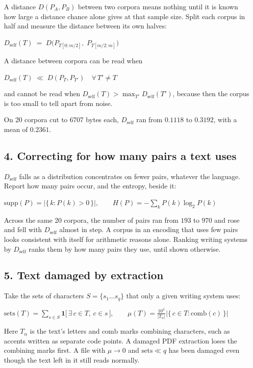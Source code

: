 A distance \(D(P_A,P_B)\) between two corpora means nothing until it is known how large a distance chance alone gives at that sample size. Split each corpus in half and measure the distance between its own halves:

\(D_{\text{self}}(T) \;=\; D\bigl(P_{T[0:m/2]},\; P_{T[m/2:m]}\bigr)\)

A distance between corpora can be read when

\(D_{\text{self}}(T) \;\ll\; D(P_T, P_{T'}) \quad \forall\, T' \neq T\)

and cannot be read when \(D_{\text{self}}(T) > \max_{T'} D_{\text{self}}(T')\), because then the corpus is too small to tell apart from noise.

On 20 corpora cut to 6707 bytes each, \(D_{\text{self}}\) ran from \(0.1118\) to \(0.3192\), with a mean of \(0.2361\).

\subsection{4. Correcting for how many pairs a text uses}

\(D_{\text{self}}\) falls as a distribution concentrates on fewer pairs, whatever the language. Report how many pairs occur, and the entropy, beside it:

\(\mathrm{supp}(P) = \bigl|\{\,k : P(k) > 0\,\}\bigr|, \qquad H(P) = -\sum_{k} P(k)\log_2 P(k)\)

Across the same 20 corpora, the number of pairs ran from \(193\) to \(970\) and rose and fell with \(D_{\text{self}}\) almost in step. A corpus in an encoding that uses few pairs looks consistent with itself for arithmetic reasons alone. Ranking writing systems by \(D_{\text{self}}\) ranks them by how many pairs they use, until shown otherwise.

\subsection{5. Text damaged by extraction}

Take the sets of characters \(S = \{s_1 \dots s_q\}\) that only a given writing system uses:

\(\mathrm{sets}(T) = \sum_{s \in S} \mathbf{1}\bigl[\,\exists\, c \in T,\ c \in s\,\bigr], \qquad \mu(T) = \frac{10^3}{|T_\alpha|}\bigl|\{\,c \in T : \mathrm{comb}(c)\,\}\bigr|\)

Here \(T_\alpha\) is the text's letters and \(\mathrm{comb}\) marks combining characters, such as accents written as separate code points. A damaged PDF extraction loses the combining marks first. A file with \(\mu \to 0\) and \(\mathrm{sets} \ll q\) has been damaged even though the text left in it still reads normally.

